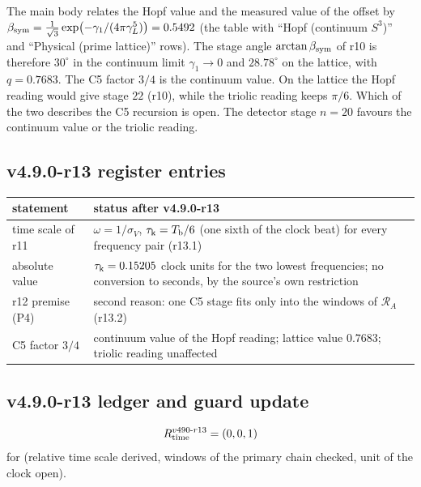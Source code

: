 The main body relates the Hopf value and the measured value of the offset by
\(\beta_{\mathrm{sym}}=\tfrac1{\sqrt3}\exp\bigl(-\gamma_1/(4\pi\gamma_L^5)\bigr)=0.5492\) (the table with ``Hopf (continuum \(S^3\))'' and
``Physical (prime lattice)'' rows).  The stage angle \(\arctan\beta_{\mathrm{sym}}\) of r10 is therefore \(30^\circ\) in the continuum limit
\(\gamma_1\to0\) and \(28.78^\circ\) on the lattice, with \(q=0.7683\).  The C5 factor \(3/4\) is the continuum value.  On the
lattice the Hopf reading would give stage \(22\) (r10), while the triolic reading keeps \(\pi/6\).  Which of the two describes
the C5 recursion is open.  The detector stage \(n=20\) favours the continuum value or the triolic reading.

\subsection*{v4.9.0-r13 register entries}
\label{subsec:v490-r13-register}

\begin{center}
\small
\begin{tabular}{@{}>{\raggedright\arraybackslash}p{}>{\raggedright\arraybackslash}p{}@{}}
\toprule
statement & status after v4.9.0-r13\\
\midrule
time scale of r11 & \(\omega=1/\sigma_V\), \(\tau_{\rm k}=T_{\rm b}/6\) (one sixth of the clock beat) for every frequency pair (r13.1)\\
absolute value & \(\tau_{\rm k}=0.15205\) clock units for the two lowest frequencies; no conversion to seconds, by the source's own restriction\\
r12 premise (P4) & second reason: one C5 stage fits only into the windows of \(\mathcal R_A\) (r13.2)\\
C5 factor \(3/4\) & continuum value of the Hopf reading; lattice value \(0.7683\); triolic reading unaffected\\
\bottomrule
\end{tabular}
\end{center}

\subsection*{v4.9.0-r13 ledger and guard update}
\label{subsec:v490-r13-ledger-guard}

\[
R_{\rm time}^{v490\text{-}r13}=(0,0,1)
\]
for (relative time scale derived, windows of the primary chain checked, unit of the clock open).

